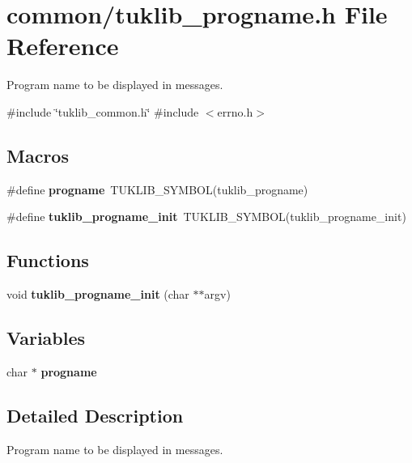 \section{common/tuklib\+\_\+progname.h File Reference}
\label{tuklib__progname_8h}


Program name to be displayed in messages.  


{\ttfamily \#include \char`\"{}tuklib\+\_\+common.\+h\char`\"{}}\newline
{\ttfamily \#include $<$errno.\+h$>$}\newline
\subsection*{Macros}
\begin{DoxyCompactItemize}
\item 
\mbox{\label{tuklib__progname_8h_a9dba1968cf53f4d45f138c8bc217086b}} 
\#define {\bfseries progname}~T\+U\+K\+L\+I\+B\+\_\+\+S\+Y\+M\+B\+OL(tuklib\+\_\+progname)
\item 
\mbox{\label{tuklib__progname_8h_aebe9b1cabbd157047189c460141bedf7}} 
\#define {\bfseries tuklib\+\_\+progname\+\_\+init}~T\+U\+K\+L\+I\+B\+\_\+\+S\+Y\+M\+B\+OL(tuklib\+\_\+progname\+\_\+init)
\end{DoxyCompactItemize}
\subsection*{Functions}
\begin{DoxyCompactItemize}
\item 
\mbox{\label{tuklib__progname_8h_a2d6344889dbe31cea9e5574f671e55dc}} 
void {\bfseries tuklib\+\_\+progname\+\_\+init} (char $\ast$$\ast$argv)
\end{DoxyCompactItemize}
\subsection*{Variables}
\begin{DoxyCompactItemize}
\item 
\mbox{\label{tuklib__progname_8h_ab9e1449fd00c98428516f0b41eddcb10}} 
char $\ast$ {\bfseries progname}
\end{DoxyCompactItemize}


\subsection{Detailed Description}
Program name to be displayed in messages. 

